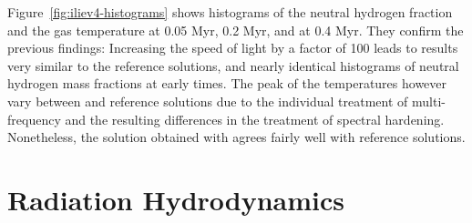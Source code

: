 Figure~\ref{fig:iliev4-histograms} shows histograms of the neutral hydrogen fraction and the gas
temperature at 0.05 Myr, 0.2 Myr, and at 0.4 Myr. They confirm the previous findings: Increasing
the speed of light by a factor of 100 leads to results very similar to the reference solutions, and
nearly identical histograms of neutral hydrogen mass fractions at early times. The peak
of the temperatures however vary between \GEARRT and reference solutions due to the individual
treatment of multi-frequency and the resulting differences in the treatment of spectral hardening.
Nonetheless, the solution obtained with \GEARRT agrees fairly well with reference solutions.













\section{Radiation Hydrodynamics}\label{chap:IL9}

